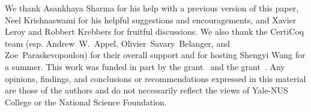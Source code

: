 \documentclass[acmsmall,screen]{acmart}
\newcommand\hide[1]{}
\begin{document}
 
\begin{acks}
We thank Asankhaya Sharma for his help with a previous version of this paper,
Neel Krishnaswami for his helpful suggestions and encouragements, and 
Xavier Leroy and Robbert Krebbers for fruitful discussions. 
We also thank the CertiCoq team (esp. Andrew~W.~Appel, Olivier~Savary~Belanger, and 
Zoe~Paraskevopoulou) for their overall support and for hosting 
Shengyi Wang for a summer. This work was funded in part by the
 grant~\mbox{} and the  grant~.
Any opinions, findings, and conclusions or recommendations expressed in 
this material are those of the authors and do not necessarily reflect the 
views of Yale-NUS College or the National Science Foundation.
\hide{

This material is based upon work supported by the
  \grantsponsor{GS100000001}{National Science
    Foundation}{http://dx.doi.org/10.13039/100000001} under Grant
  No.~\grantnum{GS100000001}{nnnnnnn} and Grant
  No.~\grantnum{GS100000001}{mmmmmmm}.  Any opinions, findings, and
  conclusions or recommendations expressed in this material are those
  of the author and do not necessarily reflect the views of the
  National Science Foundation.}
\end{acks}

\pagebreak

\end{document}
